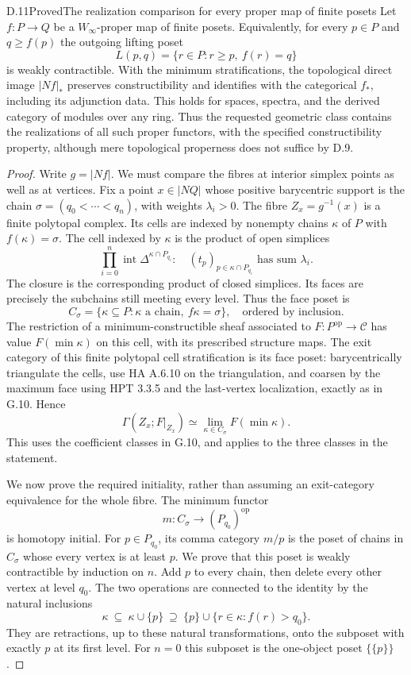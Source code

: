 \begin{claim}{D.11}{Proved}{The realization comparison for every proper map of finite posets}
Let $f:P\to Q$ be a $W_\infty$-proper map of finite posets.
Equivalently, for every $p\in P$ and $q\geq f(p)$ the outgoing
lifting poset
\[
 L(p,q)=\{r\in P:r\geq p,\ f(r)=q\}
\tag{D.11a}
\]
is weakly contractible. With the minimum stratifications, the
topological direct image $|Nf|_*$ preserves constructibility and
identifies with the categorical $f_*$, including its adjunction
data. This holds for spaces, spectra, and the derived category of
modules over any ring. Thus the requested geometric class contains
the realizations of all such proper functors, with the specified
constructibility property, although mere topological properness
does not suffice by D.9.
\end{claim}
\begin{proof}
Write $g=|Nf|$. We must compare the fibres at interior simplex
points as well as at vertices. Fix a point $x\in|NQ|$ whose
positive barycentric support is the chain
$\sigma=(q_0<\cdots<q_n)$, with weights $\lambda_i>0$.
The fibre $Z_x=g^{-1}(x)$ is a finite polytopal complex. Its cells
are indexed by nonempty chains $\kappa$ of $P$ with
$f(\kappa)=\sigma$. The cell indexed by $\kappa$ is the product
of open simplices
\[
 \prod_{i=0}^n\operatorname{int}\Delta^{\kappa\cap P_{q_i}}:
 \quad (t_p)_{p\in\kappa\cap P_{q_i}}
            \text{ has sum }\lambda_i.
\tag{D.11b}
\]
The closure is the corresponding product of closed simplices.
Its faces are precisely the subchains still meeting every level.
Thus the face poset is
\[
 C_\sigma=\{\kappa\subseteq P:\kappa\text{ a chain},\
                          f\kappa=\sigma\},
 \quad\text{ordered by inclusion}.
\]
The restriction of a minimum-constructible sheaf associated to
$F:P^{\mathrm{op}}\to\mathcal C$ has value $F(\min\kappa)$ on
this cell, with its prescribed structure maps. The exit category
of this finite polytopal cell stratification is its face poset:
barycentrically triangulate the cells, use HA A.6.10 on the
triangulation, and coarsen by the maximum face using HPT 3.3.5 and
the last-vertex localization, exactly as in G.10. Hence
\[
 \Gamma(Z_x;F|_{Z_x})
 \simeq\lim_{\kappa\in C_\sigma}F(\min\kappa).
\tag{D.11c}
\]
This uses the coefficient classes in G.10, and applies to the
three classes in the statement.

We now prove the required initiality, rather than assuming an
exit-category equivalence for the whole fibre. The minimum functor
\[
 m:C_\sigma\longrightarrow(P_{q_0})^{\mathrm{op}}
\]
is homotopy initial. For $p\in P_{q_0}$, its comma category $m/p$
is the poset of chains in $C_\sigma$ whose every vertex is at least
$p$. We prove that this poset is weakly contractible by induction
on $n$. Add $p$ to every chain, then delete every other vertex at
level $q_0$. The two operations are connected to the identity by
the natural inclusions
\[
 \kappa\ \subseteq\ \kappa\cup\{p\}\
 \supseteq\ \{p\}\cup\{r\in\kappa:f(r)>q_0\}.
\]
They are retractions, up to these natural transformations, onto
the subposet with exactly $p$ at its first level. For $n=0$ this
subposet is the one-object poset $\{\{p\}\}$.


\end{proof}
